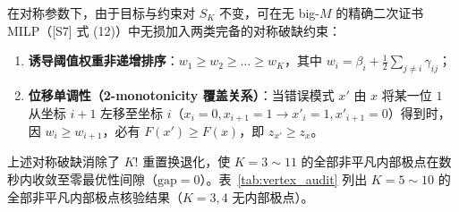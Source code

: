 \documentclass[11pt,a4paper]{article}
\theoremstyle{definition}
\theoremstyle{remark}
\begin{document}
在对称参数下，由于目标与约束对 $S_K$ 不变，可在无 big-$M$ 的精确二次证书 MILP（[S7] 式 (12)）中无损加入两类完备的对称破缺约束：
\begin{enumerate}
  \setlength{\itemsep}{2pt}\setlength{\parskip}{0pt}
  \item \textbf{诱导阈值权重非递增排序}：$w_1 \ge w_2 \ge \dots \ge w_K$，其中 $w_i = \beta_i + \frac{1}{2}\sum_{j \neq i} \gamma_{ij}$；
  \item \textbf{位移单调性（2-monotonicity 覆盖关系）}：当错误模式 $x'$ 由 $x$ 将某一位 $1$ 从坐标 $i+1$ 左移至坐标 $i$（$x_i=0, x_{i+1}=1 \to x'_i=1, x'_{i+1}=0$）得到时，因 $w_i \ge w_{i+1}$，必有 $F(x') \ge F(x)$，即 $z_{x'} \ge z_x$。
\end{enumerate}
上述对称破缺消除了 $K!$ 重置换退化，使 $K = 3 \sim 11$ 的全部非平凡内部极点在数秒内收敛至零最优性间隙（$\mathrm{gap} = 0$）。表~\ref{tab:vertex_audit} 列出 $K = 5 \sim 10$ 的全部非平凡内部极点核验结果（$K=3,4$ 无内部极点）。
\end{document}
